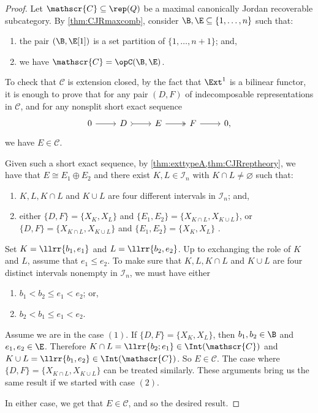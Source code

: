 \begin{proof}
    Let $\mathscr{C} \subseteq \rep(Q)$ be a maximal canonically Jordan recoverable subcategory. By \cref{thm:CJRmaxcomb}, consider $\B,\E \subseteq \{1, \ldots,n\}$ such that:
    \begin{enumerate}[label=$\bullet$,itemsep=1mm]
        \item the pair $(\B,\E[1])$ is a set partition of $\{1,\ldots,n+1\}$; and, 
        \item we have $\mathscr{C} = \opC(\B,\E)$.
    \end{enumerate} To check that $\mathscr{C}$ is extension closed, by the fact that $\Ext^1$ is a bilinear functor, it is enough to prove that for any pair $(D,F)$ of indecomposable representations in $\mathscr{C}$, and for any nonsplit short exact sequence \[\begin{tikzcd}
	0 & D & E & F &  0,
	\arrow[from=1-1, to=1-2]
	\arrow[tail, from=1-2, to=1-3]
	\arrow[two heads,from=1-3, to=1-4]
	\arrow[from=1-4, to=1-5]
\end{tikzcd}\] we have $E \in \mathscr{C}$. 
    
    Given such a short exact sequence, by \cref{thm:exttypeA,thm:CJRreptheory}, we have that $E \cong E_1 \oplus E_2$ and there exist $K,L \in \mathcal{I}_n$ with $K \cap L \neq \varnothing$ such that:
    \begin{enumerate}[label=$\bullet$,itemsep=1mm]
    \item $K,L,K \cap L$ and $K \cup L$ are four different intervals in $\mathcal{I}_n$; and,
    \item either $\{D,F\} = \{X_K, X_L\}$ and $\{E_1,E_2\} = \{X_{K\cap L}, X_{K \cup L} \}$, or \\
    $\{D,F\} = \{X_{K \cap L}, X_{K \cup L}\}$ and $\{E_1,E_2\} = \{X_{K}, X_{L} \}$ .
    \end{enumerate}

    Set $K = \llrr{b_1, e_1}$ and $L = \llrr{b_2,e_2}$. Up to exchanging the role of $K$ and $L$, assume that $e_1 \leqslant e_2$. To make sure that $K,L,K \cap L$ and $K \cup L$ are four distinct intervals nonempty in $\mathcal{I}_n$, we must have either
    \begin{enumerate}[label=$(\arabic*)$, itemsep=1mm]
        \item $b_1 < b_2 \leqslant e_1 < e_2$; or,
        \item  $b_2 < b_1 \leqslant e_1 < e_2$.
    \end{enumerate}
    Assume we are in the case $(1)$. If $\{D,F\} =\{X_K, X_L\}$, then $b_1,b_2 \in \B$ and $e_1,e_2 \in \E$. Therefore $K \cap L = \llrr{b_2;e_1} \in \Int(\mathscr{C})$ and $K \cup L = \llrr{b_1, e_2} \in \Int(\mathscr{C})$. So $E \in \mathscr{C}$. The case where $\{D,F\} = \{X_{K\cap L},X_{K \cup L}\}$ can be treated similarly. These arguments bring us the same result if we started with case $(2)$. 

    In either case, we get that $E \in \mathscr{C}$, and so the desired result.
\end{proof}

